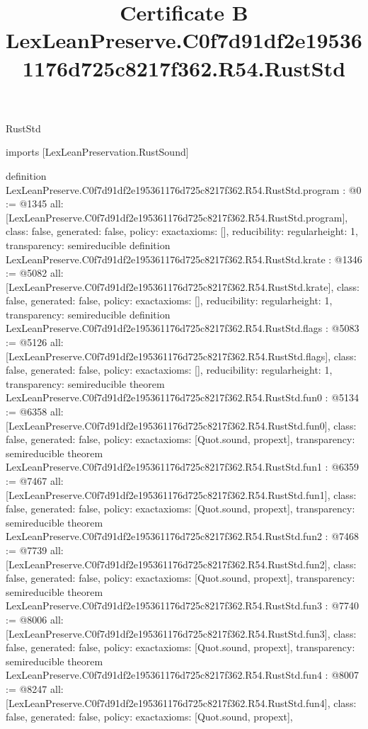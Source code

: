 \begin{lexlean}{RustStd}
\title{Certificate B LexLeanPreserve.C0f7d91df2e195361176d725c8217f362.R54.RustStd}
\begin{coremodule}
imports [LexLeanPreservation.RustSound]

definition LexLeanPreserve.C0f7d91df2e195361176d725c8217f362.R54.RustStd.program : @0 := @1345 {
  all: [LexLeanPreserve.C0f7d91df2e195361176d725c8217f362.R54.RustStd.program],
  class: false,
  generated: false,
  policy: exact{axioms: []},
  reducibility: regular{height: 1},
  transparency: semireducible
}
definition LexLeanPreserve.C0f7d91df2e195361176d725c8217f362.R54.RustStd.krate : @1346 := @5082 {
  all: [LexLeanPreserve.C0f7d91df2e195361176d725c8217f362.R54.RustStd.krate],
  class: false,
  generated: false,
  policy: exact{axioms: []},
  reducibility: regular{height: 1},
  transparency: semireducible
}
definition LexLeanPreserve.C0f7d91df2e195361176d725c8217f362.R54.RustStd.flags : @5083 := @5126 {
  all: [LexLeanPreserve.C0f7d91df2e195361176d725c8217f362.R54.RustStd.flags],
  class: false,
  generated: false,
  policy: exact{axioms: []},
  reducibility: regular{height: 1},
  transparency: semireducible
}
theorem LexLeanPreserve.C0f7d91df2e195361176d725c8217f362.R54.RustStd.fun0 : @5134 := @6358 {
  all: [LexLeanPreserve.C0f7d91df2e195361176d725c8217f362.R54.RustStd.fun0],
  class: false,
  generated: false,
  policy: exact{axioms: [Quot.sound, propext]},
  transparency: semireducible
}
theorem LexLeanPreserve.C0f7d91df2e195361176d725c8217f362.R54.RustStd.fun1 : @6359 := @7467 {
  all: [LexLeanPreserve.C0f7d91df2e195361176d725c8217f362.R54.RustStd.fun1],
  class: false,
  generated: false,
  policy: exact{axioms: [Quot.sound, propext]},
  transparency: semireducible
}
theorem LexLeanPreserve.C0f7d91df2e195361176d725c8217f362.R54.RustStd.fun2 : @7468 := @7739 {
  all: [LexLeanPreserve.C0f7d91df2e195361176d725c8217f362.R54.RustStd.fun2],
  class: false,
  generated: false,
  policy: exact{axioms: [Quot.sound, propext]},
  transparency: semireducible
}
theorem LexLeanPreserve.C0f7d91df2e195361176d725c8217f362.R54.RustStd.fun3 : @7740 := @8006 {
  all: [LexLeanPreserve.C0f7d91df2e195361176d725c8217f362.R54.RustStd.fun3],
  class: false,
  generated: false,
  policy: exact{axioms: [Quot.sound, propext]},
  transparency: semireducible
}
theorem LexLeanPreserve.C0f7d91df2e195361176d725c8217f362.R54.RustStd.fun4 : @8007 := @8247 {
  all: [LexLeanPreserve.C0f7d91df2e195361176d725c8217f362.R54.RustStd.fun4],
  class: false,
  generated: false,
  policy: exact{axioms: [Quot.sound, propext]},
}
\end{coremodule}
\end{lexlean}
